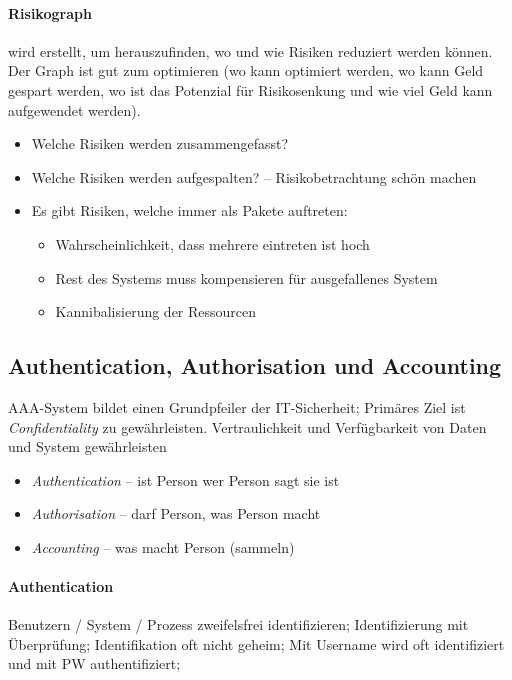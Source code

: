 \documentclass[a4paper,12pt]{article}
\begin{document}
\paragraph{Risikograph} wird erstellt, um herauszufinden, wo und wie Risiken reduziert werden können. Der Graph ist gut zum optimieren (wo kann optimiert werden, wo kann Geld gespart werden, wo ist das Potenzial für Risikosenkung und wie viel Geld kann aufgewendet werden).

\begin{itemize}
\item Welche Risiken werden zusammengefasst?
\item Welche Risiken werden aufgespalten? -- Risikobetrachtung schön machen
\item Es gibt Risiken, welche immer als Pakete auftreten:
\begin{itemize}
\item Wahrscheinlichkeit, dass mehrere eintreten ist hoch
\item Rest des Systems muss kompensieren für ausgefallenes System
\item Kannibalisierung der Ressourcen
\end{itemize}
\end{itemize}




\subsection{Authentication, Authorisation und Accounting} AAA-System bildet einen Grundpfeiler der IT-Sicherheit; Primäres Ziel ist \emph{Confidentiality} zu gewährleisten. Vertraulichkeit und Verfügbarkeit von Daten und System gewährleisten 
\begin{itemize}
\item \emph{Authentication} -- ist Person wer Person sagt sie ist
\item \emph{Authorisation} -- darf Person, was Person macht
\item \emph{Accounting} -- was macht Person (sammeln)
\end{itemize}


\paragraph{Authentication} Benutzern / System / Prozess zweifelsfrei identifizieren; Identifizierung mit Überprüfung; Identifikation oft nicht geheim; Mit Username wird oft identifiziert und mit PW authentifiziert;
\end{document}

